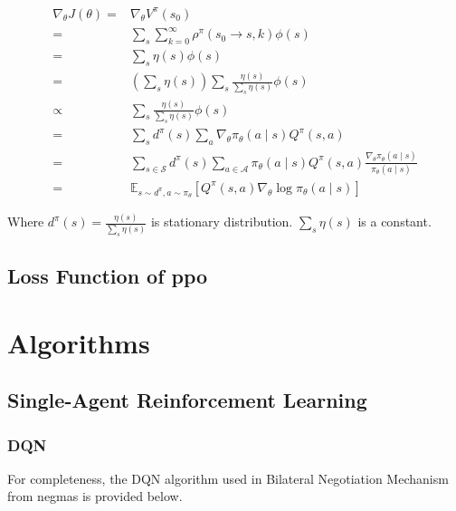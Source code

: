 \begin{appendices}
	\begin{equation}
	\begin{aligned}
	\nabla_{\theta} J(\theta)=&\nabla_{\theta} V^{\pi}\left(s_{0}\right) \\
	=& \sum_{s} \sum_{k=0}^{\infty} \rho^{\pi}\left(s_{0} \rightarrow s, k\right) \phi(s) \\
	=& \sum_{s} \eta(s) \phi(s) \\
	=& \left(\sum_{s} \eta(s)\right) \sum_{s} \frac{\eta(s)}{\sum_{s} \eta(s)} \phi(s) \\
	\propto&  \sum_{s} \frac{\eta(s)}{\sum_{s} \eta(s)} \phi(s) \\
	=& \sum_{s} d^{\pi}(s) \sum_{a} \nabla_{\theta} \pi_{\theta}(a \mid s) Q^{\pi}(s, a) \\
	=& \sum_{s \in \mathcal{S}} d^{\pi}(s) \sum_{a \in \mathcal{A}} \pi_{\theta}(a \mid s) Q^{\pi}(s, a) \frac{\nabla_{\theta} \pi_{\theta}(a \mid s)}{\pi_{\theta}(a \mid s)} \\
	=& \mathbb{E}_{s \sim d^{\pi}, a \sim \pi_{\theta}}\left[Q^{\pi}(s, a) \nabla_{\theta} \log \pi_{\theta}(a \mid s)\right]
	\end{aligned}
	\end{equation}
	
	Where $d^{\pi}(s)=\frac{\eta(s)}{\sum_{s} \eta(s)}$ is stationary distribution. $\sum_{s} \eta(s)$ is a constant. 
	
	\section{Loss Function of \gls{ppo}} \label{appendix-derivation-process-loss-ppo}
	
  \chapter{Algorithms} \label{appendices-algorithms}
  \section{Single-Agent Reinforcement Learning}
	\subsection{DQN} \label{appendix:dqn}
	For completeness, the DQN algorithm used in Bilateral Negotiation Mechanism from \gls{negmas} is provided below.
	

\end{appendices}
